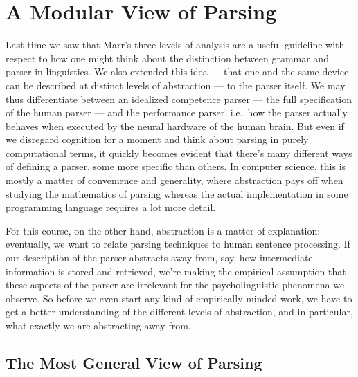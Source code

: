 \chapter{A Modular View of Parsing}
\label{cha:ParserOverview}

Last time we saw that Marr's three levels of analysis are a useful guideline with respect to how one might think about the distinction between grammar and parser in linguistics.
We also extended this idea --- that one and the same device can be described at distinct levels of abstraction --- to the parser itself. We may thus differentiate between an idealized competence parser --- the full specification of the human parser --- and the performance parser, i.e.\ how the parser actually behaves when executed by the neural hardware of the human brain.
But even if we disregard cognition for a moment and think about parsing in purely computational terms, it quickly becomes evident that there's many different ways of defining a parser, some more specific than others.
In computer science, this is mostly a matter of convenience and generality, where abstraction pays off when studying the mathematics of parsing whereas the actual implementation in some programming language requires a lot more detail.

For this course, on the other hand, abstraction is a matter of explanation: eventually, we want to relate parsing techniques to human sentence processing.
If our description of the parser abstracts away from, say, how intermediate information is stored and retrieved, we're making the empirical assumption that these aspects of the parser are irrelevant for the psycholinguistic phenomena we observe.
So before we even start any kind of empirically minded work, we have to get a better understanding of the different levels of abstraction, and in particular, what exactly we are abstracting away from.


\section{The Most General View of Parsing}
\label{sec:ParserOverview_MostGeneralView}

